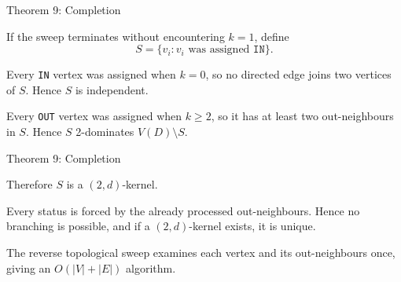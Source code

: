 \documentclass[11pt]{beamer}
\begin{document}
\begin{frame}{Theorem 9: Completion}

  If the sweep terminates without encountering $k=1$, define
  \[
    S=\{v_i:v_i\text{ was assigned }\texttt{IN}\}.
  \]

  \smallskip

  Every \texttt{IN} vertex was assigned when $k=0$, so no directed edge
  joins two vertices of $S$. Hence $S$ is independent.

  \smallskip

  Every \texttt{OUT} vertex was assigned when $k\ge2$, so it has at least
  two out-neighbours in $S$. Hence $S$ 2-dominates $V(D)\setminus S$.

\end{frame}

\begin{frame}{Theorem 9: Completion}

  Therefore $S$ is a $(2,d)$-kernel.

  \bigskip

  Every status is forced by the already processed out-neighbours.
  Hence no branching is possible, and if a $(2,d)$-kernel exists, it is
  unique.

  \bigskip

  The reverse topological sweep examines each vertex and its out-neighbours
  once, giving an $O(|V|+|E|)$ algorithm.
\end{frame}
\end{document}
